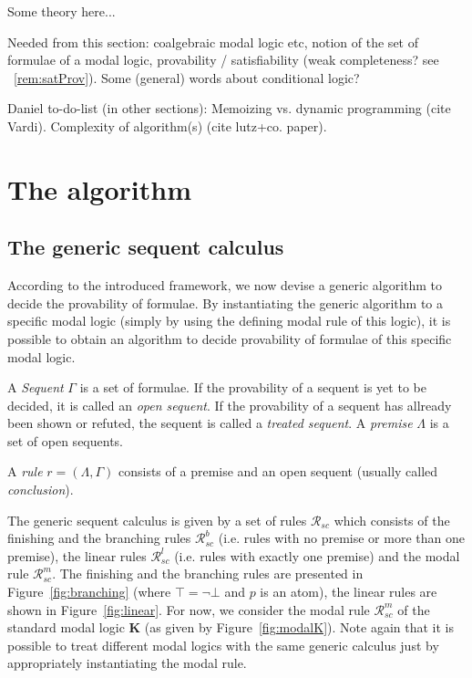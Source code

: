\documentclass{entcs} \usepackage{entcsmacro}
\begin{document}
Some theory here...

Needed from this section: coalgebraic modal logic etc, notion of the set of
formulae of a modal logic, provability / satisfiability (weak completeness?
see ~\ref{rem:satProv}).
Some (general) words about conditional logic?

Daniel to-do-list (in other sections): Memoizing vs. dynamic programming (cite Vardi).
Complexity of algorithm(s) (cite lutz+co. paper).

\section{The algorithm}

\subsection{The generic sequent calculus}

According to the introduced framework, we now devise a generic
algorithm to decide the provability of formulae. By
instantiating the generic algorithm to a specific modal logic
(simply by using the defining modal rule of this logic), it is
possible to obtain an algorithm to decide provability of
formulae of this specific modal logic.

\begin{definition}
A \emph{Sequent} $\Gamma$ is a set of formulae. If the provability
of a sequent is yet to be decided, it is called an \emph{open sequent}.
If the provability of a sequent has allready been shown or refuted,
the sequent is called a \emph{treated sequent}. A \emph{premise}
$\Lambda$ is a set of open sequents.
\end{definition}

\begin{definition}
\noindent A \emph{rule} $r=(\Lambda,\Gamma)$ consists of a premise
and an open sequent (usually called \emph{conclusion}).
\end{definition}
\noindent The generic sequent calculus is given by a set of rules
$\mathcal{R}_{sc}$ which consists of the finishing and the branching
rules $\mathcal{R}^b_{sc}$ (i.e. rules with no premise or more than
one premise), the linear rules $\mathcal{R}^l_{sc}$ (i.e. rules with
exactly one premise) and the modal rule $\mathcal R^m_{sc}$. The
finishing and the branching rules are presented in Figure~\ref{fig:branching}
(where $\top=\neg\bot$ and $p$ is an atom), the
linear rules are shown in Figure~\ref{fig:linear}. For now, we consider the modal
rule $\mathcal R^m_{sc}$ of the standard modal logic \textbf{K}
(as given by Figure~\ref{fig:modalK}). Note again that
it is possible to treat different modal logics with the same generic
calculus just by appropriately instantiating the modal rule.
\end{document}
